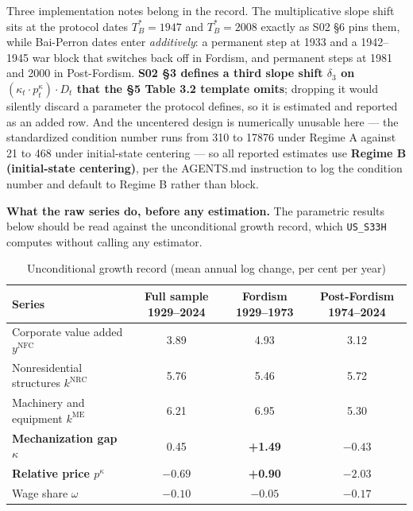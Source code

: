\documentclass[11pt,a4paper]{article}
\begin{document}
Three implementation notes belong in the record. The multiplicative slope shift sits at the protocol dates $T_B^* = 1947$ and $T_B^* = 2008$ exactly as S02 \S6 pins them, while Bai-Perron dates enter \textit{additively}: a permanent step at 1933 and a 1942--1945 war block that switches back off in Fordism, and permanent steps at 1981 and 2000 in Post-Fordism. \textbf{S02 \S3 defines a third slope shift $\delta_3$ on $(\kappa_t \cdot p_t^{\kappa}) \cdot D_t$ that the \S5 Table 3.2 template omits}; dropping it would silently discard a parameter the protocol defines, so it is estimated and reported as an added row. And the uncentered design is numerically unusable here --- the standardized condition number runs from 310 to 17876 under Regime A against 21 to 468 under initial-state centering --- so all reported estimates use \textbf{Regime B (initial-state centering)}, per the AGENTS.md instruction to log the condition number and default to Regime B rather than block.

\textbf{What the raw series do, before any estimation.} The parametric results below should be read against the unconditional growth record, which \texttt{US\_S33H} computes without calling any estimator.

\begin{table}[H]
\centering
\caption{Unconditional growth record (mean annual log change, per cent per year)}
\label{tab:specB_descriptive}
\small
\begin{tabular}{p{7.0cm}ccc}
\toprule
Series & Full sample 1929--2024 & Fordism 1929--1973 & Post-Fordism 1974--2024 \\
\midrule
Corporate value added $y^{\text{NFC}}$ & 3.89 & 4.93 & 3.12 \\
Nonresidential structures $k^{\text{NRC}}$ & 5.76 & 5.46 & 5.72 \\
Machinery and equipment $k^{\text{ME}}$ & 6.21 & 6.95 & 5.30 \\
\textbf{Mechanization gap $\kappa$} & 0.45 & \textbf{+1.49} & \textbf{$-0.43$} \\
\textbf{Relative price $p^{\kappa}$} & $-0.69$ & \textbf{+0.90} & \textbf{$-2.03$} \\
Wage share $\omega$ & $-0.10$ & $-0.05$ & $-0.17$ \\
\bottomrule
\end{tabular}
\end{table}
\end{document}
